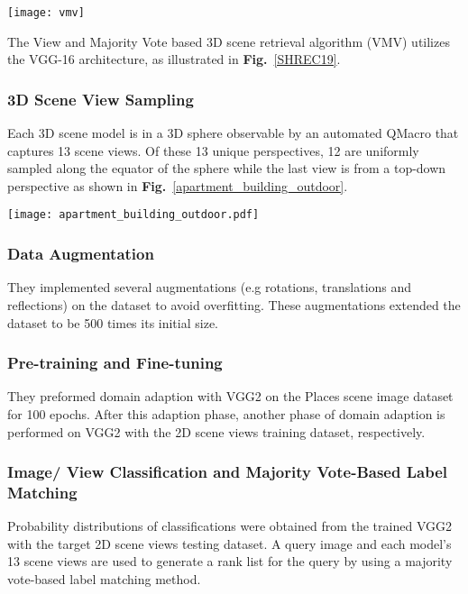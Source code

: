 \documentclass[../main.tex]{subfiles}
\begin{document}
	
\begin{center}
	\centering
	{
		\texttt{[image: vmv]}
	}
	\label{SHREC19}
\end{center}
The View and Majority Vote based 3D scene retrieval algorithm (VMV) utilizes the VGG-16 architecture, as illustrated in \textbf{Fig.}~\ref{SHREC19}. 

\subsubsection{3D Scene View Sampling}
Each 3D scene model is in a 3D sphere observable by an automated QMacro that captures 13 scene views. Of these 13 unique perspectives, 12 are uniformly sampled along the equator of the sphere while the last view is from a top-down perspective as shown in \textbf{Fig.}~\ref{apartment_building_outdoor}.
\begin{center}
	\centering
	{
		\texttt{[image: apartment\_building\_outdoor.pdf]}
	}
	\label{apartment_building_outdoor}
\end{center}

\subsubsection{Data Augmentation}
They implemented several augmentations (e.g rotations, 
translations and reflections)\cite{3DICPR} on the dataset to avoid overfitting. These augmentations extended the dataset to be 500 
times its initial size. 


\subsubsection{Pre-training and Fine-tuning}   
They preformed domain adaption with VGG2 on the Places scene image dataset \cite{zhou2017places} for 100 epochs. After this adaption phase, another phase of domain adaption is performed on VGG2 with the 2D scene views training dataset, respectively.

\subsubsection{Image/ View Classification and Majority Vote-Based Label Matching}
Probability distributions of classifications were obtained from the trained VGG2 with the target 2D scene views testing dataset. A query image and each model's 13 scene views are used to generate a rank list for the query by using a majority vote-based label matching method.
\end{document}
